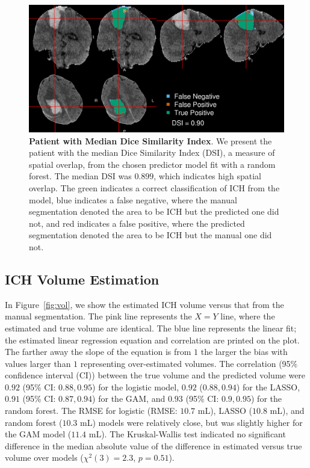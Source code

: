 \documentclass{elsarticle_nonatbib}\usepackage[]{graphicx}\usepackage[]{color}
\begin{document}
\begin{figure}
\centering
\includegraphics[width=\linewidth,keepaspectratio]{figures/Long/Reseg_Figure_DSI_Quantile_050_native.png}
\caption{{\bf Patient with Median Dice Similarity Index}. We present the patient with the median Dice Similarity Index (DSI), a measure of spatial overlap, from the chosen predictor model fit with a random forest.  The median DSI was $0.899$, which indicates high spatial overlap. The green indicates a correct classification of ICH from the model, blue indicates a false negative, where the manual segmentation denoted the area to be ICH but the predicted one did not, and red indicates a false positive, where the predicted segmentation denoted the area to be ICH but the manual one did not. }
\label{fig:dice_img}
\end{figure}


\subsection{ICH Volume Estimation}
In Figure~\ref{fig:vol}, we show the estimated ICH volume versus that from the manual segmentation.  The pink line represents the $X = Y$ line, where the estimated and true volume are identical.  The blue line represents the linear fit; the estimated linear regression equation and correlation are printed on the plot.  The farther away the slope of the equation is from $1$ the larger the bias with values larger than $1$ representing over-estimated volumes.
The correlation (95\% confidence interval (CI)) between the true volume and the predicted volume were $0.92$ (95\% CI: $0.88, 0.95$) for the logistic model,
$0.92$ ($0.88, 0.94$) for the LASSO,
$0.91$ (95\% CI: $0.87, 0.94$) for the GAM, and
$0.93$ (95\% CI: $0.9, 0.95$) for the random forest.  The RMSE for logistic (RMSE: $10.7$ mL), LASSO ($10.8$ mL), and random forest ($10.3$ mL) models were relatively close, but was slightly higher for the GAM model ($11.4$ mL).  The  Kruskal-Wallis test indicated no significant difference in the median absolute value of the difference in estimated versus true volume over models ($\chi^{2}(3)=2.3$, $p = 0.51$).
\end{document}
